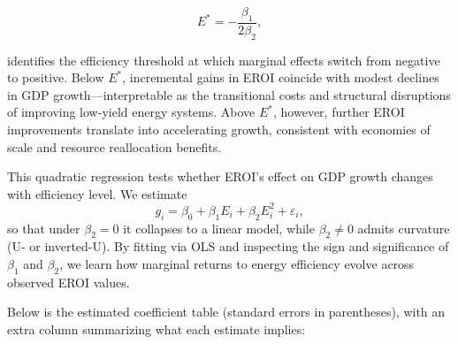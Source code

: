 \documentclass[a4paper,12pt]{article}
\begin{document}
\begin{equation}
E^{*} = -\frac{\beta_{1}}{2 \beta_{2}},
\end{equation}

identifies the efficiency threshold at which marginal effects switch from negative to positive. Below \( E^{*} \), incremental gains in EROI coincide with modest declines in GDP growth—interpretable as the transitional costs and structural disruptions of improving low-yield energy systems. Above \( E^{*} \), however, further EROI improvements translate into accelerating growth, consistent with economies of scale and resource reallocation benefits.

This quadratic regression tests whether EROI’s effect on GDP growth changes with efficiency level. We estimate
\begin{equation}
g_i = \beta_0 + \beta_1 E_i + \beta_2 E_i^2 + \varepsilon_i,
\end{equation}
so that under \( \beta_2 = 0 \) it collapses to a linear model, while \( \beta_2 \neq 0 \) admits curvature (U- or inverted-U). By fitting via OLS and inspecting the sign and significance of \( \beta_1 \) and \( \beta_2 \), we learn how marginal returns to energy efficiency evolve across observed EROI values.

Below is the estimated coefficient table (standard errors in parentheses), with an extra column summarizing what each estimate implies:
\end{document}

